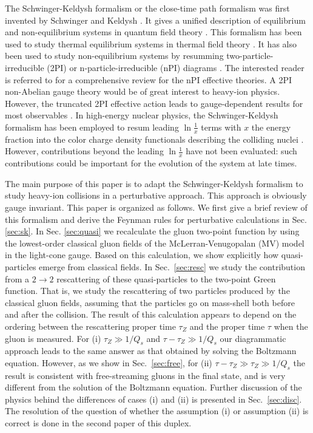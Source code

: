 \documentclass[onecolumn,showpacs,nobibnotes,nofootinbib,12pt,aps,prd,showpacs,notitlepage,nofootinbib,preprintnumbers,amsmath,amssymb]{article}
\begin{document}
The Schwinger-Keldysh formalism or the close-time path formalism was
first invented by Schwinger \cite{Schwinger:1960qe} and Keldysh
\cite{Keldysh:1964ud}. It gives a unified description of equilibrium
and non-equilibrium systems in quantum field theory
\cite{Chou:1984es}. This formalism has been used to study thermal
equilibrium systems in thermal field theory
\cite{Landsman:1986uw,Bellac:2011kqa}. It has also been used to study
non-equilibrium systems by resumming two-particle-irreducible (2PI) or
n-particle-irreducible (nPI) diagrams
\cite{Cornwall:1974vz,Calzetta:1986cq,Berges:2004pu}. The interested
reader is referred to \cite{Berges:2004yj,Calzetta:1986cq} for a
comprehensive review for the nPI effective theories. A 2PI non-Abelian
gauge theory would be of great interest to heavy-ion physics. However,
the truncated 2PI effective action leads to gauge-dependent results
for most observables \cite{Carrington:2003ut}. In high-energy nuclear
physics, the Schwinger-Keldysh formalism has been employed to resum
leading $\ln \frac{1}{x}$ terms with $x$ the energy fraction into the
color charge density functionals describing the colliding nuclei
\cite{Gelis:2008rw,Gelis:2008ad,Jeon:2013zga}. However, contributions
beyond the leading $\ln \frac{1}{x}$ have not been evaluated: such
contributions could be important for the evolution of the system at
late times.

The main purpose of this paper is to adapt the Schwinger-Keldysh
formalism to study heavy-ion collisions in a perturbative approach.
This approach is obviously gauge invariant. This paper is organized as
follows. We first give a brief review of this formalism and derive the
Feynman rules for perturbative calculations in Sec. \ref{sec:sk}.  In
Sec. \ref{sec:quasi} we recalculate the gluon two-point function by
using the lowest-order classical gluon fields of the
McLerran-Venugopalan (MV) model
\cite{McLerran:1993ni,McLerran:1993ka,McLerran:1994vd} in the
light-cone gauge.  Based on this calculation, we show explicitly how
quasi-particles emerge from classical fields. In Sec.~\ref{sec:resc}
we study the contribution from a $2\to 2$ rescattering of these
quasi-particles to the two-point Green function. That is, we study the
rescattering of two particles produced by the classical gluon fields,
assuming that the particles go on mass-shell both before and after the
collision. The result of this calculation appears to depend on the
ordering between the rescattering proper time $\tau_Z$ and the proper
time $\tau$ when the gluon is measured. For (i) $\tau_Z\gg 1/Q_s$ and
$\tau-\tau_Z\gg 1/Q_s$ our diagrammatic approach leads to the same
answer as that obtained by solving the Boltzmann equation. However, as
we show in Sec.~\ref{sec:free}, for (ii) $\tau-\tau_Z\gg \tau_Z\gg
1/Q_s$ the result is consistent with free-streaming gluons in the
final state, and is very different from the solution of the Boltzmann
equation. Further discussion of the physics behind the differences of
cases (i) and (ii) is presented in Sec.~\ref{sec:disc}. The resolution
of the question of whether the assumption (i) or assumption (ii) is
correct is done in the second paper \cite{KovchegovWu} of this duplex.
\end{document}
